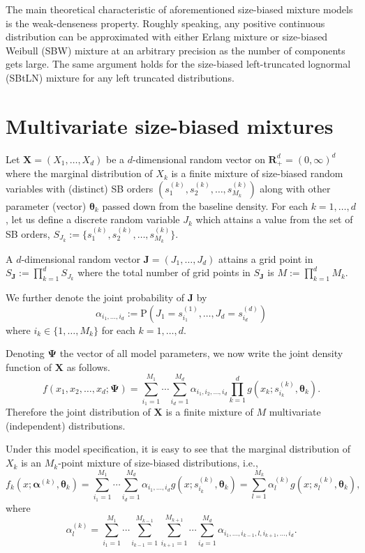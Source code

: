 \documentclass[eng]{csam}
\def\a{\alpha}
\def\mP{\text{P}}
\begin{document}
The main theoretical characteristic of aforementioned size-biased mixture models is the weak-denseness property. Roughly speaking, any positive continuous distribution can be approximated with either Erlang mixture or size-biased Weibull (SBW) mixture at an arbitrary precision as the number of components gets large. The same argument holds for the size-biased left-truncated lognormal (SBtLN) mixture for any left truncated distributions.

\section{Multivariate size-biased mixtures}\label{sec3}

Let $\bm{X} = (X_1,\ldots, X_d)$ be a $d$-dimensional random vector on $\bm{R}_+^d = (0,\infty)^d$ where the marginal distribution of $X_k$ is a finite mixture of size-biased random variables with (distinct) SB orders $(s_1^{(k)}, s_2^{(k)}, \ldots, s_{M_k}^{(k)})$ along with other parameter (vector) $\bm{\theta}_k$ passed down from the baseline density. For each $k = 1,\ldots, d$, let us define a discrete random variable $J_k$ which attains a value from the set of SB orders, $S_{J_k} := \{s_1^{(k)}, s_2^{(k)}, \ldots, s_{M_k}^{(k)}\}$.

A $d$-dimensional random vector $\bm{J} = (J_1,\ldots, J_d)$ attains a grid point in $S_{\bm{J}} := \prod_{k=1}^d S_{J_k}$ where the total number of grid points in $S_{\bm{J}}$ is $M := \prod_{k=1}^d M_k$.

We further denote the joint probability of $\bm{J}$ by
\begin{equation*}
\a_{i_1,\ldots,i_d} := \mP\left(J_1 = s^{(1)}_{i_1}, \ldots, J_d = s^{(d)}_{i_d}\right)
\end{equation*}
where $i_k \in \{1,\ldots, M_k\}$ for each $k = 1,\ldots, d$.

Denoting $\bm{\Psi}$ the vector of all model parameters, we now write the joint density function of $\bm{X}$ as follows.
\begin{equation}\label{pdf_joint}
f(x_1,x_2,\ldots,x_d; \bm{\Psi}) = \sum_{i_1 = 1}^{M_1} \cdots\sum_{i_d = 1}^{M_d} \a_{i_1,i_2,\ldots,i_d} \prod_{k=1}^d g(x_k;s^{(k)}_{i_k}, \bm{\theta}_k).
\end{equation}
Therefore the joint distribution of $\bm{X}$ is a finite mixture of $M$ multivariate (independent) distributions.

Under this model specification, it is easy to see that the marginal distribution of $X_k$ is an $M_k$-point mixture of size-biased distributions, i.e.,
\begin{equation}\label{marginal_density}
f_k(x; \bm{\a}^{(k)}, \bm{\theta}_k) = \sum_{i_1 = 1}^{M_1} \cdots\sum_{i_d = 1}^{M_d} \a_{i_1,\ldots,i_d}g(x;s^{(k)}_{i_k},\bm{\theta}_k) = \sum_{l = 1}^{M_k} \a^{(k)}_{l} g(x;s^{(k)}_{l},\bm{\theta}_k),
\end{equation}
where
\begin{equation*}
\a^{(k)}_{l} = \sum_{i_1 = 1}^{M_1} \cdots \sum_{i_{k-1} = 1}^{M_{k-1}}\sum_{i_{k+1} = 1}^{M_{k+1}}\cdots \sum_{i_d = 1}^{M_d} \a_{i_1,\ldots,i_{k-1}, l, i_{k+1},\ldots, i_d}.
\end{equation*}
\end{document}
